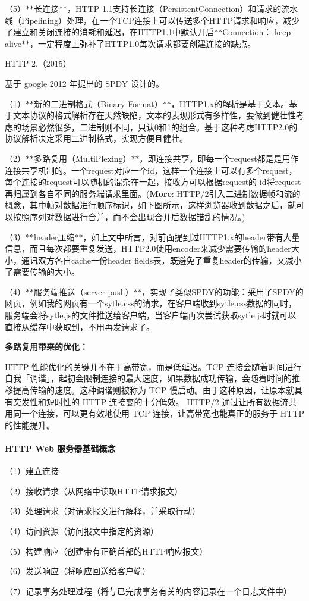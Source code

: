 （5）$\ast$$\ast$长连接$\ast$$\ast$，\+H\+T\+TP 1.\+1支持长连接（\+Persistent\+Connection）和请求的流水线（\+Pipelining）处理，在一个\+T\+C\+P连接上可以传送多个\+H\+T\+T\+P请求和响应，减少了建立和关闭连接的消耗和延迟，在\+H\+T\+T\+P1.1中默认开启$\ast$$\ast$\+Connection： keep-\/alive$\ast$$\ast$，一定程度上弥补了\+H\+T\+T\+P1.0每次请求都要创建连接的缺点。


\begin{DoxyEnumerate}
\item H\+T\+TP 2.（2015）
\end{DoxyEnumerate}

基于 google 2012 年提出的 S\+P\+DY 设计的。

（1）$\ast$$\ast$新的二进制格式（\+Binary Format）$\ast$$\ast$，\+H\+T\+T\+P1.x的解析是基于文本。基于文本协议的格式解析存在天然缺陷，文本的表现形式有多样性，要做到健壮性考虑的场景必然很多，二进制则不同，只认0和1的组合。基于这种考虑\+H\+T\+T\+P2.0的协议解析决定采用二进制格式，实现方便且健壮。

（2）$\ast$$\ast$多路复用（\+Multi\+Plexing）$\ast$$\ast$，即连接共享，即每一个request都是是用作连接共享机制的。一个request对应一个id，这样一个连接上可以有多个request，每个连接的request可以随机的混杂在一起，接收方可以根据request的 id将request再归属到各自不同的服务端请求里面。({\bfseries More}\+: H\+T\+T\+P/2引入二进制数据帧和流的概念，其中帧对数据进行顺序标识，如下图所示，这样浏览器收到数据之后，就可以按照序列对数据进行合并，而不会出现合并后数据错乱的情况。)

（3）$\ast$$\ast$header压缩$\ast$$\ast$，如上文中所言，对前面提到过\+H\+T\+T\+P1.x的header带有大量信息，而且每次都要重复发送，\+H\+T\+T\+P2.0使用encoder来减少需要传输的header大小，通讯双方各自cache一份header fields表，既避免了重复header的传输，又减小了需要传输的大小。

（4）$\ast$$\ast$服务端推送（server push）$\ast$$\ast$，实现了类似\+S\+P\+D\+Y的功能：采用了\+S\+P\+D\+Y的网页，例如我的网页有一个sytle.css的请求，在客户端收到sytle.\+css数据的同时，服务端会将sytle.\+js的文件推送给客户端，当客户端再次尝试获取sytle.\+js时就可以直接从缓存中获取到，不用再发请求了。

{\bfseries 多路复用带来的优化：}

H\+T\+TP 性能优化的关键并不在于高带宽，而是低延迟。\+T\+CP 连接会随着时间进行自我「调谐」，起初会限制连接的最大速度，如果数据成功传输，会随着时间的推移提高传输的速度。这种调谐则被称为 T\+CP 慢启动。由于这种原因，让原本就具有突发性和短时性的 H\+T\+TP 连接变的十分低效。 H\+T\+T\+P/2 通过让所有数据流共用同一个连接，可以更有效地使用 T\+CP 连接，让高带宽也能真正的服务于 H\+T\+TP 的性能提升。

 



\paragraph*{H\+T\+TP Web 服务器基础概念}



（1）建立连接

（2）接收请求（从网络中读取\+H\+T\+T\+P请求报文）

（3）处理请求（对请求报文进行解释，并采取行动）

（4）访问资源（访问报文中指定的资源）

（5）构建响应（创建带有正确首部的\+H\+T\+T\+P响应报文）

（6）发送响应（将响应回送给客户端）

（7）记录事务处理过程（将与已完成事务有关的内容记录在一个日志文件中） 